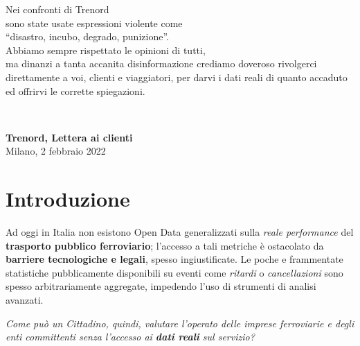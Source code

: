 \documentclass[12pt,italian]{report}
\begin{document}
\frontespizio \beforepreface

\hfill
\begin{minipage}{15cm}
	\hfill
	\begin{minipage}[t]{11cm}
		\raggedleft \large { \sl

			Nei confronti di Trenord \\
			sono state usate espressioni violente come \\
			``disastro, incubo, degrado, punizione''. \\
			\bigskip
			Abbiamo sempre rispettato le opinioni di tutti,\\
			ma dinanzi a tanta accanita disinformazione crediamo
            doveroso rivolgerci direttamente a voi, clienti e
            viaggiatori, per darvi i dati reali di quanto accaduto ed
            offrirvi le corrette spiegazioni.

			\bigskip }
	\end{minipage} \\
	\raggedleft \large

	\textbf{Trenord, Lettera ai clienti} \\
	Milano, 2 febbraio 2022
\end{minipage}
	
	
\afterpreface
	
\listoftodos
	
\chapter{Introduzione}

Ad oggi in Italia non esistono Open Data generalizzati sulla
\textit{reale performance} del \textbf{trasporto pubblico
    ferroviario}; l'accesso a tali metriche è ostacolato da
\textbf{barriere tecnologiche e legali}, spesso ingiustificate.  Le
poche e frammentate statistiche pubblicamente disponibili su eventi
come \textit{ritardi} o \textit{cancellazioni} sono spesso
arbitrariamente aggregate, impedendo l'uso di strumenti di analisi
avanzati.

\textit{Come può un Cittadino, quindi, valutare l'operato delle
    imprese ferroviarie e degli enti committenti senza l'accesso ai
    \textbf{dati reali} sul servizio?}
\end{document}
